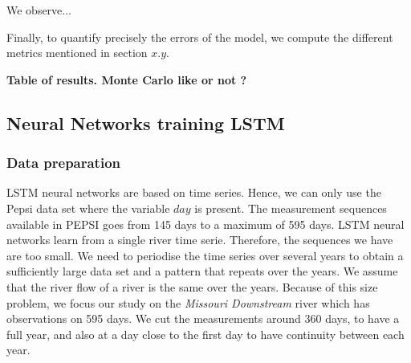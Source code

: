 We observe...

Finally, to quantify precisely the errors of the model, we compute the different metrics mentioned in section $x.y$.\newline

\textbf{Table of results. Monte Carlo like or not ?}
 
\subsection{Neural Networks training LSTM}

\subsubsection{Data preparation}
LSTM neural networks are based on time series. Hence, we can only use the Pepsi data set where the variable $day$ is present. The measurement sequences available in PEPSI goes from 145 days to a maximum of 595 days. LSTM neural networks learn from a single river time serie. Therefore, the sequences we have are too small. We need to periodise the time series over several years to obtain a sufficiently large data set and a pattern that repeats over the years. We assume that the river flow of a river is the same over the years. Because of this size problem, we focus our study on the \textit{Missouri Downstream} river which has observations on 595 days. We cut the measurements around 360 days, to have a full year, and also at a day close to the first day to have continuity between each year. 

